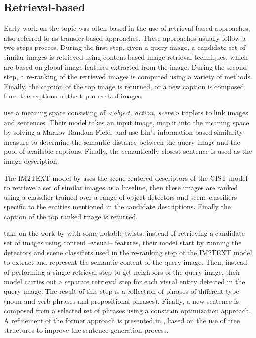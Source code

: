 \subsection{Retrieval-based} \label{subsec:retrieval-based_methods}

Early work on the topic was often based in the use of retrieval-based approaches, also referred to as transfer-based approaches. These approaches usually follow a two steps process. During the first step, given a query image, a candidate set of similar images is retrieved using content-based image retrieval techniques, which are based on global image features extracted from the image. During the second step, a re-ranking of the retrieved images is computed using a variety of methods. Finally, the caption of the top image is returned, or a new caption is composed from the captions of the top-n ranked images.

\citet{Farhadi2010} use a meaning space consisting of \textit{<object, action, scene>} triplets to link images and sentences. Their model takes an input image, map it into the meaning space by solving a Markov Random Field, and use Lin's information-based similarity measure \citep{Lin1998} to determine the semantic distance between the query image and the pool of available captions. Finally, the semantically closest sentence is used as the image description.

The IM2TEXT model by \citet{Ordonez2011} uses the scene-centered descriptors of the GIST model \citep{Oliva2006, Torralba2008} to retrieve a set of similar images as a baseline, then these images are ranked using a classifier trained over a range of object detectors and scene classifiers specific to the entities mentioned in the candidate descriptions. Finally the caption of the top ranked image is returned. 

\citet{Kuznetsova2012} take on the work by \citet{Ordonez2011} with some notable twists: instead of retrieving a candidate set of images using content --visual-- features, their model start by running the detectors and scene classifiers used in the re-ranking step of the IM2TEXT model to extract and represent the semantic content of the query image. Then, instead of performing a single retrieval step to get neighbors of the query image, their model carries out a separate retrieval step for each visual entity detected in the query image. The result of this step is a collection of phrases of different type (noun and verb phrases and prepositional phrases). Finally, a new sentence is composed from a selected set of phrases using a constrain optimization approach. A refinement of the former approach is presented in \citet{Kuznetsova2014}, based on the use of tree structures to improve the sentence generation process.

